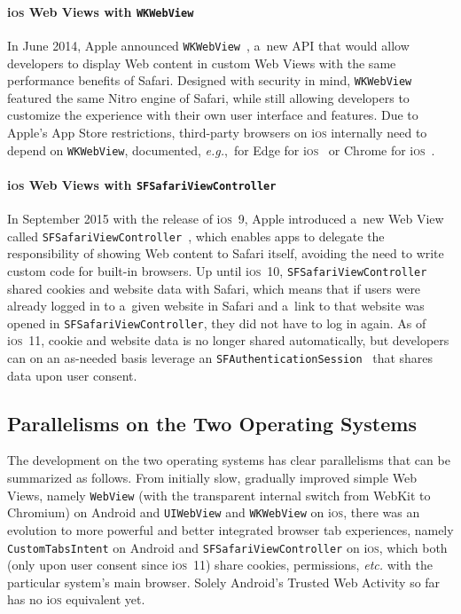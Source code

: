 \documentclass[sigconf]{acmart}
\begin{document}
\paragraph{i\textsc{os} Web Views with \texttt{WKWebView}}

In June 2014, Apple announced \texttt{WKWebView}~\cite{apple2018wkwebview},
a~new API that would allow developers
to display Web content in custom Web Views with the same performance benefits of Safari.
Designed with security in mind, \texttt{WKWebView} featured the same Nitro engine of Safari,
while still allowing developers to customize the experience
with their own user interface and features.
Due to Apple's App Store restrictions, third-party browsers on i\textsc{os}
internally need to depend on \texttt{WKWebView}, documented,
\emph{e.g.},\ for Edge for i\textsc{os}~\cite{lyndersay2017edge}
or Chrome for i\textsc{os}~\cite{chromiumblog2016chrome}.

\paragraph{i\textsc{os} Web Views with \texttt{SFSafariViewController}}

In September 2015 with the release of i\textsc{os}~9, Apple introduced a~new Web View called
\texttt{SFSafariViewController}~\cite{apple2018sfsafariviewcontroller},
which enables apps to delegate the responsibility of showing Web content to Safari itself,
avoiding the need to write custom code for built-in browsers.
Up until i\textsc{os}~10, \texttt{SFSafariViewController}
shared cookies and website data with Safari,
which means that if users were already logged in to a~given website in Safari
and a~link to that website was opened in \texttt{SFSafariViewController},
they did not have to log in again.
As of i\textsc{os}~11, cookie and website data is no longer shared automatically,
but developers can on an as-needed basis leverage
an \texttt{SFAuthenticationSession}~\cite{apple2018sfauthenticationsession}
that shares data upon user consent. 

\subsection{Parallelisms on the Two Operating Systems}

The development on the two operating systems has clear parallelisms
that can be summarized as follows.
From initially slow, gradually improved simple Web Views, namely \texttt{WebView}
(with the transparent internal switch from WebKit to Chromium)
on Android and \texttt{UIWebView} and \texttt{WKWebView} on i\textsc{os},
there was an evolution to more powerful and better integrated browser tab experiences,
namely \texttt{CustomTabsIntent} on Android and
\texttt{SFSafariViewController} on i\textsc{os},
which both (only upon user consent since i\textsc{os}~11)
share cookies, permissions, \emph{etc.}
with the particular system's main browser.
Solely Android's Trusted Web Activity so far has no i\textsc{os} equivalent yet.
\end{document}
